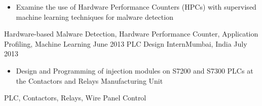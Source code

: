 \begin{experiences}
{                      \begin{itemize}
                        \item Examine the use of Hardware Performance Counters (HPCs) with supervised machine learning techniques for malware detection
                      \end{itemize}
                    }
                    {Hardware-based Malware Detection, Hardware Performance Counter, Application Profiling, Machine Learning}
  \emptySeparator
  \experience
    {June 2013}    {}{PLC Design Intern}{Mumbai, India}
    {July 2013}    {
                      \begin{itemize}
                        \item Design and Programming of injection modules on S7200 and S7300 PLCs at the Contactors and Relays Manufacturing Unit \\
                      \end{itemize}
                    }
                    {PLC, Contactors, Relays, Wire Panel Control}
\end{experiences}
